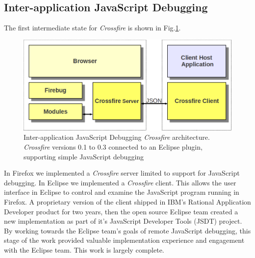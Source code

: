 \subsection{Inter-application JavaScript Debugging}
The first intermediate state for \textit{Crossfire} is shown in Fig.\ref{fig:fireclipse}.
\begin{figure}[htp]
  \includegraphics  [width = 86 mm] {figures/fireclipse.png}
  \caption{Inter-application JavaScript Debugging \textit{Crossfire} architecture.
\textit{Crossfire} versions 0.1 to 0.3 connected to an Eclipse plugin, supporting simple JavaScript debugging}
 \label{fig:fireclipse}
\end{figure}
In Firefox we implemented a \textit{Crossfire} server limited to support for JavaScript debugging.
In Eclipse we implemented a \textit{Crossfire} client. This allows the user interface in Eclipse to control
 and examine the JavaScript program running
in Firefox.  A proprietary version of the client shipped in IBM's Rational
Application Developer product for two years, then the open source Eclipse team created a new implementation as part of it's JavaScript Developer
Tools (JSDT) project\cite{EclipseJSDT}.  By working towards the Eclipse team's
goals of remote JavaScript debugging, this stage of the work provided valuable implementation
experience and engagement with the Eclipse team.
This work is largely complete.


